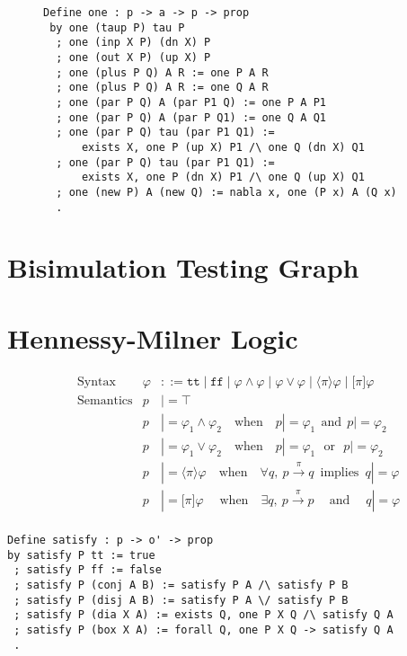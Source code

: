 \documentclass{llncs}
\begin{document}
\begin{figure}
\begin{verbatim}
Define one : p -> a -> p -> prop
 by one (taup P) tau P
  ; one (inp X P) (dn X) P
  ; one (out X P) (up X) P
  ; one (plus P Q) A R := one P A R
  ; one (plus P Q) A R := one Q A R
  ; one (par P Q) A (par P1 Q) := one P A P1
  ; one (par P Q) A (par P Q1) := one Q A Q1
  ; one (par P Q) tau (par P1 Q1) :=
      exists X, one P (up X) P1 /\ one Q (dn X) Q1
  ; one (par P Q) tau (par P1 Q1) :=
      exists X, one P (dn X) P1 /\ one Q (up X) Q1
  ; one (new P) A (new Q) := nabla x, one (P x) A (Q x)
  .
\end{verbatim}
\label{fig:ccsone}
\end{figure}
\section{Bisimulation Testing Graph}


\section{Hennessy-Milner Logic}\label{sec:hml}
\begin{align*}
&\text{Syntax} &
\varphi & ::= \texttt{tt} \mid \texttt{ff}
    \mid \varphi \land \varphi \mid \varphi \lor \varphi
    \mid \langle\pi\rangle \varphi \mid \lbrack\pi\rbrack \varphi
\\
&\text{Semantics} &
  p & |= \top \\&&
  p & |= \varphi_1 \land \varphi_2 \quad\text{when}\quad p |= \varphi_1 ~~\text{and}~~ p |= \varphi_2 \\&&
  p & |= \varphi_1 \lor \varphi_2 \quad\text{when}\quad p |= \varphi_1 ~~~\text{or}~~~ p |= \varphi_2 \\&&
  p & |= \langle \pi \rangle \varphi \quad\text{when}\quad \forall q,~ p\xrightarrow{\pi} q ~\;\text{implies}~\; q |= \varphi \\&&
  p & |= \lbrack \pi \rbrack \varphi \;\quad\text{when}\quad \exists q,~ p\xrightarrow{\pi} p ~\quad\text{and}\quad\; q |= \varphi \\&&
\end{align*}

\begin{verbatim}
Define satisfy : p -> o' -> prop
by satisfy P tt := true
 ; satisfy P ff := false
 ; satisfy P (conj A B) := satisfy P A /\ satisfy P B
 ; satisfy P (disj A B) := satisfy P A \/ satisfy P B
 ; satisfy P (dia X A) := exists Q, one P X Q /\ satisfy Q A
 ; satisfy P (box X A) := forall Q, one P X Q -> satisfy Q A
 .
\end{verbatim}
\end{document}
